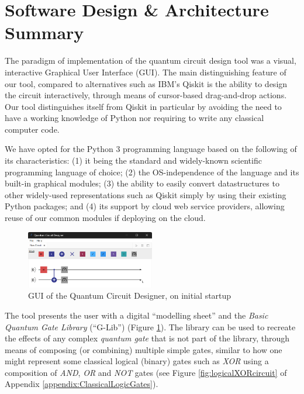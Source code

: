 \documentclass[conference]{IEEEtran}
\begin{document}
\section{Software Design \& Architecture Summary}

The paradigm of implementation of the quantum circuit design tool was a visual, interactive Graphical User Interface (GUI).
The main distinguishing feature of our tool, compared to %
alternatives such as IBM's Qiskit \cite{ref:ibmqiskitdocs} is the ability to design the circuit interactively, through means of
cursor-based drag-and-drop actions.
Our tool distinguishes itself from Qiskit in particular by avoiding the need to have a working
knowledge of Python nor requiring to write any classical computer code.

We have opted for the Python 3 programming language based on the following of its characteristics:
(1) it being the standard and widely-known scientific programming language of choice;
(2) the OS-independence of the language and its built-in graphical modules;
(3) the ability to easily convert datastructures to other widely-used representations such as Qiskit simply by using their existing Python packages;
and (4) its support by cloud web service providers\cite{ref:amazonawsserverless}, allowing reuse of our common modules if deploying on the cloud.

\begin{figure}[tbp]
\centerline{
    \includegraphics[width=0.5\textwidth]{img/ui_startup.png}
}
\caption{GUI of the Quantum Circuit Designer, on initial startup}
\label{fig:guiToolOnStartup}
\end{figure}

The tool presents the user with a digital ``modelling sheet'' and the \textit{Basic Quantum Gate Library} (``G-Lib'') (Figure \ref{fig:guiToolOnStartup}).
The library can be used to recreate the effects of any complex \textit{quantum gate} that
is not part of the library, through means of composing (or combining) multiple simple gates, similar to how one might represent some
classical logical (binary) gates such as \textit{XOR} using a composition
of \textit{AND}, \textit{OR} and \textit{NOT} gates (see Figure \ref{fig:logicalXORcircuit} of Appendix \ref{appendix:ClassicalLogicGates}).
\end{document}
